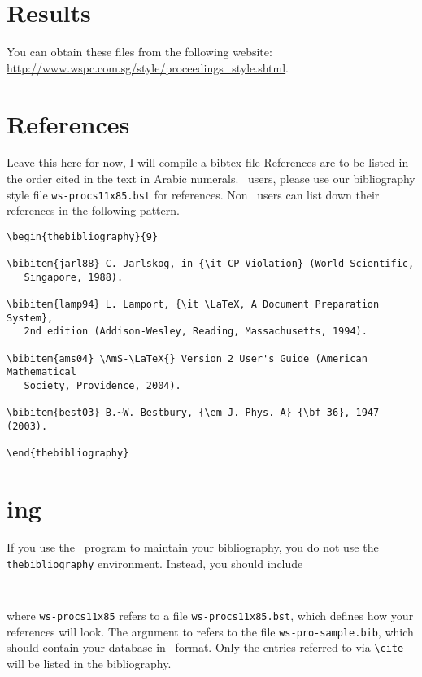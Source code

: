 \documentclass{ws-procs11x85}
\begin{document}
\section{Results}
You can obtain these files from the following website:
\url{http://www.wspc.com.sg/style/proceedings_style.shtml}.




\section{References}
Leave this here for now, I will compile a bibtex file
References are to be listed in the order cited in the text in Arabic
numerals. \btex\ users, please use our bibliography style file
\verb|ws-procs11x85.bst| for references. Non \btex\ users can list
down their references in the following pattern.

\begin{verbatim}
\begin{thebibliography}{9}

\bibitem{jarl88} C. Jarlskog, in {\it CP Violation} (World Scientific,
   Singapore, 1988).

\bibitem{lamp94} L. Lamport, {\it \LaTeX, A Document Preparation System},
   2nd edition (Addison-Wesley, Reading, Massachusetts, 1994).

\bibitem{ams04} \AmS-\LaTeX{} Version 2 User's Guide (American Mathematical
   Society, Providence, 2004).

\bibitem{best03} B.~W. Bestbury, {\em J. Phys. A} {\bf 36}, 1947 (2003).

\end{thebibliography}
\end{verbatim}

\section{{\btex}ing}

If you use the \btex\ program to maintain your bibliography, you do
not use the \verb|thebibliography| environment. Instead, you should
include
\begin{verbatim}


\end{verbatim}

\noindent where \verb|ws-procs11x85| refers to a file \verb|ws-procs11x85.bst|,
which defines how your references will look.
The argument to \verb|| refers to the file
\verb|ws-pro-sample.bib|, which should contain your database in
\btex\ format. Only the entries referred to via \verb|\cite| will be
listed in the bibliography.
\end{document}
